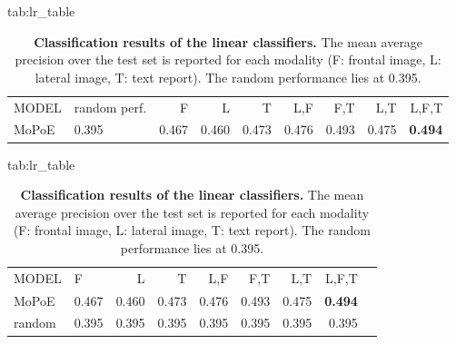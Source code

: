 \documentclass{midl} %
\begin{document}
    \begin{table}[htbp]
    \floatconts
      {tab:lr_table}%
      {\caption{\textbf{Classification results of the linear classifiers.} 
      The mean average precision over the test set is reported for each modality (F: frontal image, L: lateral image, T: text report).
      The random performance lies at 0.395.}}%
      {\begin{tabular}{llrrrrrrr}
                MODEL   & random perf. & F     & L     & T     & L,F   & F,T   & L,T   & L,F,T          \\
                MoPoE & 0.395 & 0.467 & 0.460 & 0.473 & 0.476 & 0.493 & 0.475 & \textbf{0.494} \\
                
    
            \end{tabular}}
    \end{table}
        \begin{table}[htbp]
    \floatconts
      {tab:lr_table}%
      {\caption{\textbf{Classification results of the linear classifiers.} 
      The mean average precision over the test set is reported for each modality (F: frontal image, L: lateral image, T: text report).
      The random performance lies at 0.395.}}%
      {\begin{tabular}{llrrrrrrr}
                MODEL    & F     & L     & T     & L,F   & F,T   & L,T   & L,F,T          \\
                MoPoE  & 0.467 & 0.460 & 0.473 & 0.476 & 0.493 & 0.475 & \textbf{0.494} \\
                random & 0.395 & 0.395 & 0.395 & 0.395 & 0.395 & 0.395& 0.395
    
            \end{tabular}}
    \end{table}
    
    
\end{document}
